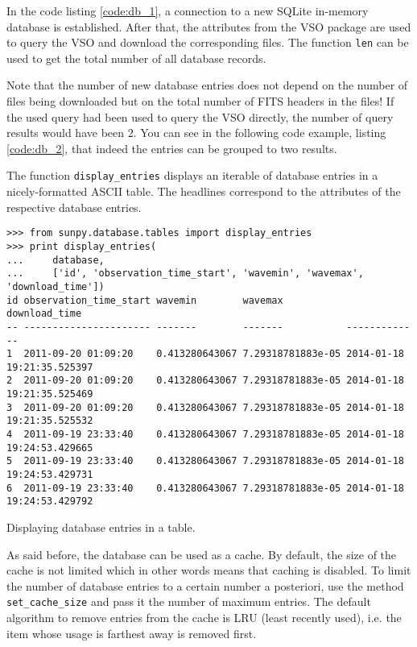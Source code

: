 In the code listing \ref{code:db_1}, a connection to a new SQLite in-memory
database is established. After that, the attributes from the \textsc{VSO}
package are used to query the \textsc{VSO} and download the corresponding
files. The function \texttt{len} can be used to get the total number of all database
records.

Note that the number of new database entries does not depend on the
number of files being downloaded but on the total number of \textsc{FITS}
headers in the files! If the used query had been used to query the \textsc{VSO}
directly, the number of query results would have been 2. You can see in the
following code example, listing \ref{code:db_2}, that indeed the entries can
be grouped to two results.

The function \texttt{display\_entries} displays an iterable of database entries
in a nicely-formatted \textsc{ASCII} table. The headlines correspond to the
attributes of the respective database entries.

\begin{listing}
\begin{verbatim}
>>> from sunpy.database.tables import display_entries
>>> print display_entries(
...     database,
...     ['id', 'observation_time_start', 'wavemin', 'wavemax', 'download_time'])
id observation_time_start wavemin        wavemax           download_time             
-- ---------------------- -------        -------           -------------             
1  2011-09-20 01:09:20    0.413280643067 7.29318781883e-05 2014-01-18 19:21:35.525397
2  2011-09-20 01:09:20    0.413280643067 7.29318781883e-05 2014-01-18 19:21:35.525469
3  2011-09-20 01:09:20    0.413280643067 7.29318781883e-05 2014-01-18 19:21:35.525532
4  2011-09-19 23:33:40    0.413280643067 7.29318781883e-05 2014-01-18 19:24:53.429665
5  2011-09-19 23:33:40    0.413280643067 7.29318781883e-05 2014-01-18 19:24:53.429731
6  2011-09-19 23:33:40    0.413280643067 7.29318781883e-05 2014-01-18 19:24:53.429792
\end{verbatim}
\caption{Displaying database entries in a table.}
\label{code:db_2}
\end{listing}

As said before, the database can be used as a cache. By default, the size of
the cache is not limited which in other words means that caching is disabled.
To limit the number of database entries to a certain number a posteriori, use
the method \texttt{set\_cache\_size} and pass it the number of maximum entries.
The default algorithm to remove entries from the cache is \textsc{LRU}
(least recently used), i.e. the item whose usage is farthest away is removed
first.  %

